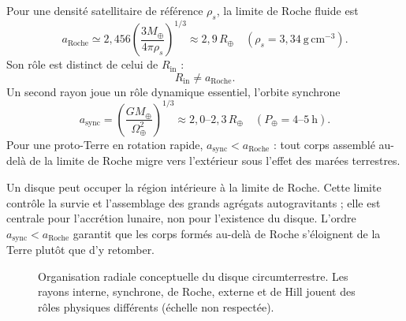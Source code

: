 \documentclass[11pt,a4paper,openany]{report}
\newcommand{\Mt}{M_{\oplus}}
\newcommand{\Rt}{R_{\oplus}}
\newcommand{\aR}{a_{\mathrm{Roche}}}
\begin{document}
Pour une densité satellitaire de référence $\rho_s$, la limite de Roche fluide est
\begin{equation}
\aR\simeq2{,}456\left(\frac{3\Mt}{4\pi\rho_s}\right)^{1/3}
\approx2{,}9\,\Rt\quad(\rho_s=3{,}34\ \mathrm{g\,cm^{-3}}).
\label{eq:Roche}
\end{equation}
Son rôle est distinct de celui de $R_{\mathrm{in}}$ :
\begin{equation}
R_{\mathrm{in}}\neq\aR.
\label{eq:RinRoche}
\end{equation}
Un second rayon joue un rôle dynamique essentiel, l'orbite synchrone
\begin{equation}
a_{\mathrm{sync}}=\left(\frac{G\Mt}{\Omega_\oplus^2}\right)^{1/3}\approx2{,}0\text{--}2{,}3\,\Rt
\quad(P_\oplus=4\text{--}5\ \mathrm{h}).
\label{eq:async}
\end{equation}
Pour une proto-Terre en rotation rapide, $a_{\mathrm{sync}}<\aR$ : tout corps assemblé au-delà de
la limite de Roche migre vers l'extérieur sous l'effet des marées terrestres.

\begin{lecture}
Un disque peut occuper la région intérieure à la limite de Roche. Cette limite contrôle la survie
et l'assemblage des grands agrégats autogravitants ; elle est centrale pour l'accrétion lunaire,
non pour l'existence du disque. L'ordre $a_{\mathrm{sync}}<\aR$ garantit que les corps formés
au-delà de Roche s'éloignent de la Terre plutôt que d'y retomber.
\end{lecture}

\begin{figure}[htbp]
\centering
{}
\caption{Organisation radiale conceptuelle du disque circumterrestre. Les rayons interne,
synchrone, de Roche, externe et de Hill jouent des rôles physiques différents (échelle non
respectée).}
\label{fig:radial}
\end{figure}
\end{document}
